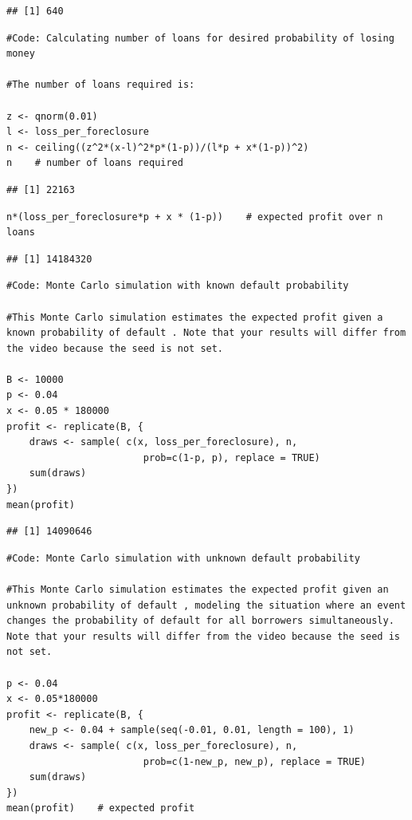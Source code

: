 \documentclass[
]{article}
\begin{document}
\begin{verbatim}
## [1] 640
\end{verbatim}

\begin{verbatim}
#Code: Calculating number of loans for desired probability of losing money

#The number of loans required is:

z <- qnorm(0.01)
l <- loss_per_foreclosure
n <- ceiling((z^2*(x-l)^2*p*(1-p))/(l*p + x*(1-p))^2)
n    # number of loans required
\end{verbatim}

\begin{verbatim}
## [1] 22163
\end{verbatim}

\begin{verbatim}
n*(loss_per_foreclosure*p + x * (1-p))    # expected profit over n loans
\end{verbatim}

\begin{verbatim}
## [1] 14184320
\end{verbatim}

\begin{verbatim}
#Code: Monte Carlo simulation with known default probability

#This Monte Carlo simulation estimates the expected profit given a known probability of default . Note that your results will differ from the video because the seed is not set.

B <- 10000
p <- 0.04
x <- 0.05 * 180000
profit <- replicate(B, {
    draws <- sample( c(x, loss_per_foreclosure), n, 
                        prob=c(1-p, p), replace = TRUE) 
    sum(draws)
})
mean(profit)
\end{verbatim}

\begin{verbatim}
## [1] 14090646
\end{verbatim}

\begin{verbatim}
#Code: Monte Carlo simulation with unknown default probability

#This Monte Carlo simulation estimates the expected profit given an unknown probability of default , modeling the situation where an event changes the probability of default for all borrowers simultaneously. Note that your results will differ from the video because the seed is not set.

p <- 0.04
x <- 0.05*180000
profit <- replicate(B, {
    new_p <- 0.04 + sample(seq(-0.01, 0.01, length = 100), 1)
    draws <- sample( c(x, loss_per_foreclosure), n, 
                        prob=c(1-new_p, new_p), replace = TRUE) 
    sum(draws)
})
mean(profit)    # expected profit
\end{verbatim}
\end{document}
